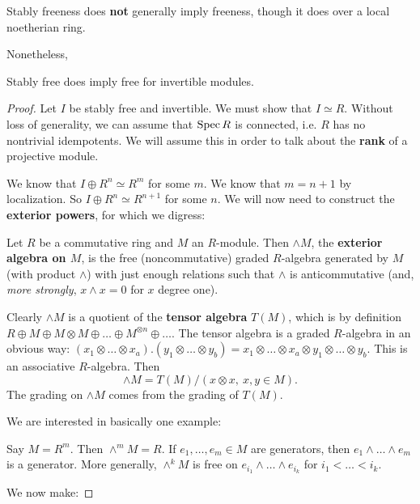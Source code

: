 \begin{remark} 
Stably freeness does \textbf{not} generally imply freeness, though it does
over a local noetherian ring.
\end{remark} 

Nonetheless,

\begin{proposition} 
Stably free does imply free for invertible modules. 
\end{proposition} 
\begin{proof} 
Let $I$ be stably free and invertible. We must show that $I \simeq R$.
Without loss of generality, we can assume that $\operatorname{Spec} R$ is connected, i.e.
$R$ has no nontrivial idempotents. We will assume this in order to talk about
the \textbf{rank} of a projective module.

We know that $I \oplus R^n \simeq R^m$ for some $m$. We know that $m=n+1$ by
localization. So $I \oplus R^n \simeq R^{n+1}$ for some $n$.
We will now need to construct the \textbf{exterior powers}, for which we
digress:

\begin{definition} 
Let $R$ be a commutative ring and $M$ an $R$-module. Then $\wedge M$, the
\textbf{exterior algebra on $M$}, is the free (noncommutative) graded $R$-algebra
generated by $M$ (with product $\wedge$) with just enough relations such that
$\wedge$ is anticommutative (and, \emph{more strongly}, $x \wedge x=0$ for
$x$ degree one).
\end{definition} 

Clearly $\wedge M$ is a quotient of the \textbf{tensor algebra} $T(M)$, which is by
definition $R
\oplus M \oplus M \otimes M \oplus \dots \oplus M^{\otimes n} \oplus \dots$.
The tensor algebra is a graded $R$-algebra in an obvious way: $(x_1 \otimes
\dots \otimes x_a) . (y_1 \otimes \dots \otimes y_b) = x_1 \otimes \dots
\otimes x_a \otimes y_1 \otimes \dots \otimes y_b$. This is an associative
$R$-algebra. 
Then 
\[ \wedge M = T(M)/( x \otimes x, \ x,y \in M).  \]
The grading on $\wedge M$ comes from the grading of $T(M)$. 

We are interested in basically one example:
\begin{example} 
Say $M = R^m$. Then $\wedge^m M = R$. If $e_1, \dots, e_m \in M$ are
generators, then $e_1 \wedge \dots \wedge e_m$ is a generator. More generally,
$\wedge^k M$ is free on $e_{i_1} \wedge \dots \wedge e_{i_k}$ for $i_1 < \dots <
i_k$.
\end{example} 

We now make:


\end{proof}
